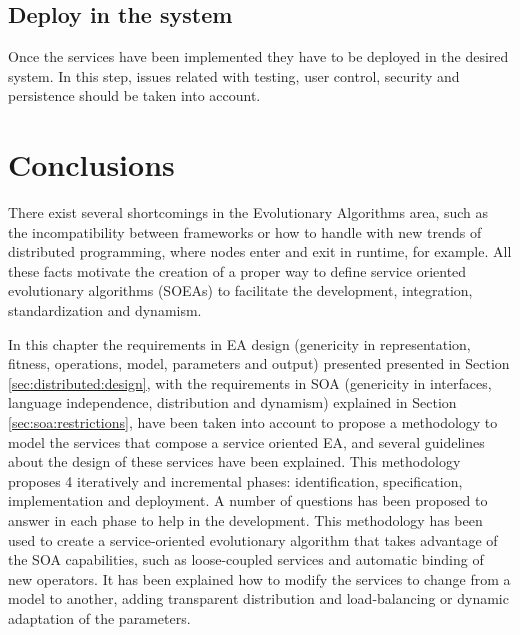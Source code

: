 \subsection{Deploy in the system} 
Once the services have been implemented they have to be deployed in the desired system. In this step, issues related with testing, user control, security and persistence should be taken into account.












\section{Conclusions}

There exist several shortcomings in the Evolutionary Algorithms area, such as the  incompatibility between frameworks or how to handle with new trends of distributed programming, where nodes enter and exit in runtime, for example. All these facts  motivate the creation of a proper way to define service oriented evolutionary algorithms (SOEAs) to facilitate the development, integration, standardization and dynamism.

In this chapter the requirements in EA design (genericity in representation, fitness, operations, model, parameters and output) presented presented in Section \ref{sec:distributed:design}, with the requirements in SOA (genericity in interfaces, language independence, distribution and dynamism) explained in Section \ref{sec:soa:restrictions}, have been taken into account to propose a methodology to model the services that compose a service oriented EA, and several guidelines about the design of these services have been explained. This methodology proposes 4 iteratively and incremental phases: identification, specification, implementation and deployment. A number of questions has been proposed to answer in each phase to help in the development. This methodology has been used to create a service-oriented evolutionary algorithm that takes advantage of the SOA capabilities, such as loose-coupled services and automatic binding of new operators. It has been explained how to modify the services to change from a model to another, adding transparent distribution and load-balancing or dynamic adaptation of the parameters.



